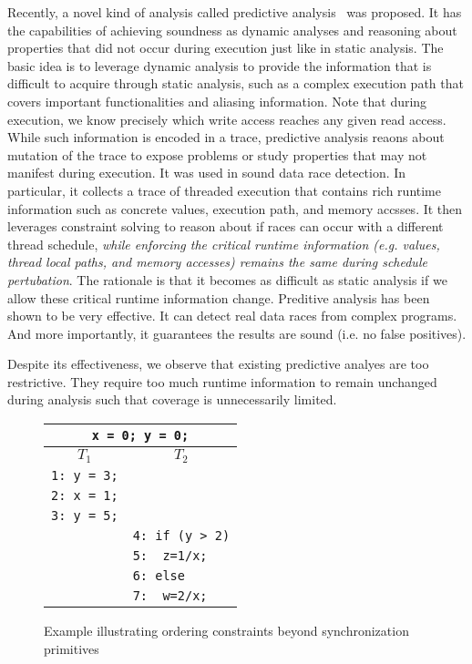 Recently, a novel kind of analysis called predictive analysis~\cite{...} was proposed. It has the capabilities of 
achieving soundness as dynamic analyses and reasoning about properties that did not occur during execution 
just like in static analysis. The basic idea is to leverage dynamic analysis to provide the information that 
is difficult to acquire through static analysis, such as a complex execution path that covers important functionalities 
and aliasing information. Note that during execution, we know precisely which write access reaches any given read 
access. While such information is encoded in a trace, predictive analysis reaons about mutation of the trace to 
expose problems or study properties that may not manifest during execution. It was used in sound data race detection. 
In particular, it collects a trace of threaded execution that contains rich runtime information such as concrete values, 
execution path, and memory accsses. It then leverages constraint solving to reason about if races can occur with
a different thread schedule, {\em while enforcing the critical runtime information (e.g. values, thread
local paths, and memory accesses) remains the same during schedule pertubation}. The rationale is that 
it becomes as difficult as static analysis if we allow these critical runtime information change. 
Preditive analysis has been shown to be very effective. It can detect real data races from complex programs.
And more importantly, it guarantees the results are sound (i.e. no false positives).

Despite its effectiveness, we observe that existing predictive analyes are too restrictive. They 
require too much runtime information to remain unchanged during analysis such that coverage is unnecessarily
limited. 


\begin{figure}
\centering
\begin{tabular}{ll}
\multicolumn{2}{c}{{\tt x = 0; y = 0;}} \\  %
\hline
\multicolumn{1}{c}{$T_1$} & \multicolumn{1}{c}{$T_2$} \\
\hline
{\tt 1: y = 3;} & \\
{\tt 2: x = 1;} & \\
{\tt 3: y = 5;} & \\
& {\tt 4: if (y > 2)} \\
& {\tt 5:~~z=1/x;} \\	
& {\color{red} {\tt 6: else}} \\
& {\color{red} {\tt 7:~~w=2/x;}}
\end{tabular}
\caption{Example illustrating ordering constraints beyond synchronization primitives}
\label{fig:running}
\end{figure}

